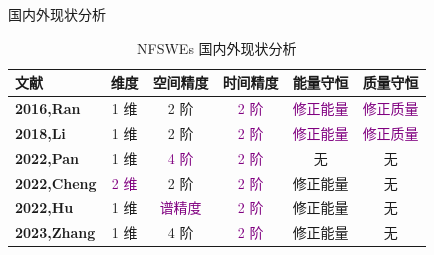 \documentclass[aspectratio=169]{beamer}
\begin{document}
		\begin{frame}{国内外现状分析}
			\begin{table}[htbp]
				\centering
				\small
				\caption{NFSWEs 国内外现状分析}
				  \begin{tabular}{lccccc}
				  \toprule
				  \textcolor[rgb]{0.227,0.373,0.306}{\textbf{文献}} & \textcolor[rgb]{0.227,0.373,0.306}{\textbf{维度}} & \textcolor[rgb]{0.227,0.373,0.306}{\textbf{空间精度}} & \textcolor[rgb]{0.227,0.373,0.306}{\textbf{时间精度}} & \textcolor[rgb]{0.227,0.373,0.306}{\textbf{能量守恒}} & \textcolor[rgb]{0.227,0.373,0.306}{\textbf{质量守恒}} \\
				  \midrule
				  \textcolor[rgb]{0.227,0.373,0.306}{\textbf{\cite{ranLinearlyImplicitConservative2016}{2016,Ran}}} & 1 维   & 2 阶   & \textcolor{purple}{2 阶}   & \textcolor{purple}{修正能量}  & \textcolor{purple}{修正质量} \\
				  \midrule
				  \textcolor[rgb]{0.227,0.373,0.306}{\textbf{\cite{liFastEnergyConserving2018}{2018,Li}}} & 1 维   & 2 阶   & \textcolor{purple}{2 阶}   & \textcolor{purple}{修正能量}  & \textcolor{purple}{修正质量} \\
				  \midrule
				  \textcolor[rgb]{0.227,0.373,0.306}{\textbf{\cite{panFourthorderDifferenceScheme2022}{2022,Pan}}} & 1 维   & \textcolor{purple}{4 阶}   & \textcolor{purple}{2 阶}   & 无     & 无 \\
				  \midrule
				  \textcolor[rgb]{0.227,0.373,0.306}{\textbf{\cite{chengConvergenceEnergyconservingScheme2022}{2022,Cheng}}} & \textcolor{purple}{2 维}   & 2 阶   & \textcolor{purple}{2 阶}   & 修正能量  & 无 \\
				  \midrule
				  \textcolor[rgb]{0.227,0.373,0.306}{\textbf{\cite{huEfficientEnergyPreserving2022}{2022,Hu}}} & 1 维   & \textcolor{purple}{谱精度}   & \textcolor{purple}{2 阶}   & 修正能量  & 无 \\
				  \midrule
				  \textcolor[rgb]{0.227,0.373,0.306}{\textbf{\cite{zhangHighorderStructurepreservingDifference2023}{2023,Zhang}}} & 1 维   & 4 阶   & \textcolor{purple}{2 阶}   & 修正能量  & 无 \\
				  \bottomrule
				  \end{tabular}%
				\label{tab:2}%
			  \end{table}%
				\end{frame}
	
\end{document}
